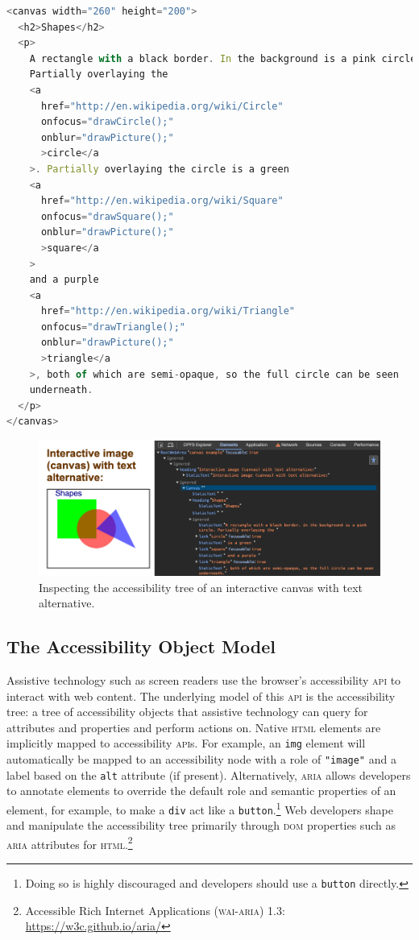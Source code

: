 \documentclass[sigconf]{acmart}
\begin{document}
\begin{lstlisting}[language=JavaScript, style=ES6, label={lst:canvas}, caption={Interactive canvas with text alternative. (Source: \url{https://www.html5accessibility.com/tests/canvas.html})}]
<canvas width="260" height="200">
  <h2>Shapes</h2>
  <p>
    A rectangle with a black border. In the background is a pink circle.
    Partially overlaying the
    <a
      href="http://en.wikipedia.org/wiki/Circle"
      onfocus="drawCircle();"
      onblur="drawPicture();"
      >circle</a
    >. Partially overlaying the circle is a green
    <a
      href="http://en.wikipedia.org/wiki/Square"
      onfocus="drawSquare();"
      onblur="drawPicture();"
      >square</a
    >
    and a purple
    <a
      href="http://en.wikipedia.org/wiki/Triangle"
      onfocus="drawTriangle();"
      onblur="drawPicture();"
      >triangle</a
    >, both of which are semi-opaque, so the full circle can be seen
    underneath.
  </p>
</canvas>
\end{lstlisting}

\begin{figure}[h]
\includegraphics[width=\columnwidth]{canvas.png}
\caption{Inspecting the accessibility tree of an interactive canvas with text alternative.}
\label{fig:canvas}
\end{figure}

\subsection{The Accessibility Object Model}

Assistive technology such as screen readers use the browser's accessibility \textsc{api} to interact with web content. The underlying model of this \textsc{api} is the accessibility tree: a tree of accessibility objects that assistive technology can query for attributes and properties and perform actions on. Native \textsc{html} elements are implicitly mapped to accessibility \textsc{api}s. For example, an \texttt{img} element will automatically be mapped to an accessibility node with a role of \texttt{"image"} and a label based on the \texttt{alt} attribute (if present). Alternatively, \textsc{aria} allows developers to annotate elements to override the default role and semantic properties of an element, for example, to make a \texttt{div} act like a \texttt{button}.\footnote{Doing so is highly discouraged and developers should use a \texttt{button} directly.} Web developers shape and manipulate the accessibility tree primarily through \textsc{dom} properties such as \textsc{aria} attributes for \textsc{html}.\footnote{Accessible Rich Internet Applications (\textsc{wai}-\textsc{aria}) 1.3: \url{https://w3c.github.io/aria/}}
\end{document}
